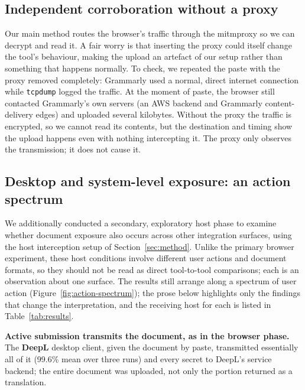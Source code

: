 \documentclass[sigconf,anonymous,review,balance=false]{acmart}
\begin{document}
\subsection{Independent corroboration without a proxy}

Our main method routes the browser's traffic through the mitmproxy so we can decrypt and
read it. A fair worry is that inserting the proxy could itself change the tool's behaviour,
making the upload an artefact of our setup rather than something that happens normally. To
check, we repeated the paste with the proxy removed completely: Grammarly used a normal,
direct internet connection while \texttt{tcpdump} logged the traffic. At the moment of paste, the browser still
contacted Grammarly's own servers (an AWS backend and Grammarly content-delivery edges) and
uploaded several kilobytes. Without the proxy the traffic is encrypted, so we cannot read
its contents, but the destination and timing show the upload happens even with nothing
intercepting it. The proxy only observes the transmission; it does not cause it.

\subsection{Desktop and system-level exposure: an action spectrum}
\label{sec:action-spectrum}

We additionally conducted a secondary, exploratory host phase to examine whether document
exposure also occurs across other integration surfaces, using the host interception setup
of Section~\ref{sec:method}. Unlike the primary browser experiment, these host conditions
involve different user actions and document formats, so they should not be read as direct
tool-to-tool comparisons; each is an observation about one surface. The results still
arrange along a spectrum of user action (Figure~\ref{fig:action-spectrum}); the prose below
highlights only the findings that change the interpretation, and the receiving host for
each is listed in Table~\ref{tab:results}.

\textbf{Active submission transmits the document, as in the browser phase.} The \textbf{DeepL} desktop
client, given the document by paste, transmitted essentially all of it (99.6\% mean over
three runs) and every secret to DeepL's service backend; the entire document was uploaded,
not only the portion returned as a translation.
\end{document}
